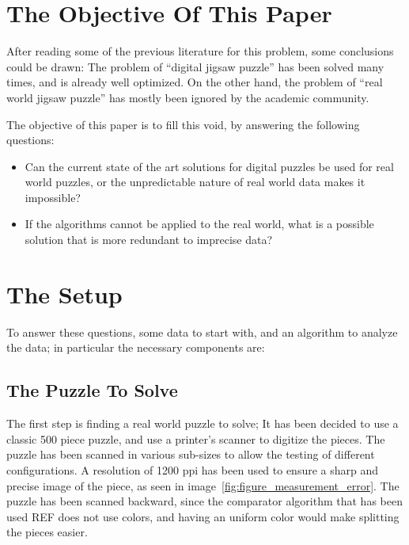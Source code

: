 \documentclass{article}
\begin{document}
\section{The Objective Of This Paper}
After reading some of the previous literature for this problem, some conclusions could be drawn:
The problem of “digital jigsaw puzzle” has been solved many times, and is already well optimized.\newline
On the other hand, the problem of “real world jigsaw puzzle” has mostly been ignored\newline
by the academic community.\newline

The objective of this paper is to fill this void, by answering the following questions:
\begin{itemize}
    \item Can the current state of the art solutions for digital puzzles be used for real world puzzles, or the unpredictable nature of real world data makes it impossible?
    \item If the algorithms cannot be applied to the real world, what is a possible solution that is more redundant to imprecise data?

  \end{itemize}

\section{The Setup}

To answer these questions, some data to start with,
and an algorithm to analyze the data; in particular the necessary components are:


\subsection{The Puzzle To Solve}

The first step is finding a real world puzzle to solve;
It has been decided to use a classic 500 piece puzzle, and use a printer's
scanner to digitize the pieces.\newline
The puzzle has been scanned in various sub-sizes to allow the testing of different configurations. 
A resolution of 1200 ppi has been used to ensure a sharp and precise image
of the piece, as seen in image~\ref{fig:figure_measurement_error}.
The puzzle has been scanned backward, since the comparator algorithm
that has been used REF does not use colors,
and having an uniform color would make splitting the pieces easier.
\end{document}
